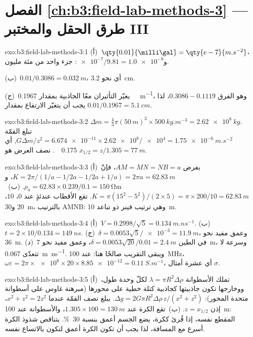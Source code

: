 \section*{الفصل \ref{ch:b3:field-lab-methods-3} --- طرق الحقل والمختبر III}

\begin{solution}{exo:b3:field-lab-methods-3:1}
(أ)~$\qty{0.01}{\milli\gal} = \qty{e-7}{m.s^{-2}}$،
و$\num{e-7}/\num{9.81} = \num{1.0e-8}$: جزء واحد من مئة مليون.

(ب)~$0.01/0.3086 = \qty{0.032}{m}$، أي نحو \qty{3.2}{cm}.

(ج)~يغيّر التأثيران معًا الجاذبية بمقدار
\qty{0.1967}{\milli\gal.m^{-1}}، وهو الفرق $0.3086 - 0.1119$، لذا
يجب أن يتغيّر الارتفاع بمقدار $0.01/0.1967 = \qty{5.1}{cm}$.
\end{solution}

\begin{solution}{exo:b3:field-lab-methods-3:2}
$\Delta m = \tfrac43\pi(\qty{50}{m})^3\times\qty{500}{kg.m^{-3}} =
\qty{2.62e8}{kg}$. تبلغ القمّة $G\Delta m/z^2 =
\num{6.674e-11}\times\num{2.62e8}/\num{e4} = \qty{1.75e-6}{m.s^{-2}}$,
أي \qty{0.175}{\milli\gal}. نصف العرض هو $x_{1/2} = z/1.305 =
\qty{77}{m}$.
\end{solution}

\begin{solution}{exo:b3:field-lab-methods-3:3}
(أ)~بفرض $AM = MN = NB = a$، فإنّ $K = 2\pi/(1/a - 1/2a - 1/2a + 1/a) =
2\pi a = \qty{62.83}{m}$، و$\rho_a = 62.83\times0.239/0.1 =
\qty{150}{\ohm\metre}$. (ب)~$K = \pi(15^2 - 5^2)/(2\times5) = \pi\times
200/10 = \qty{62.83}{m}$. تقع الأقطاب عندئذٍ عند $0$، $10$، $20$
و\qty{30}{m}، بالترتيب AMNB: وهي ترتيب فينر ذو تباعد
\qty{10}{m}.
\end{solution}

\begin{solution}{exo:b3:field-lab-methods-3:4}
(أ)~$V = 0.2998/\sqrt5 = \qty{0.134}{m.ns^{-1}}$. (ب)~$t =
2\times10/0.134 = \qty{149}{ns}$. (ج)~$\delta = 0.0053\sqrt5/\num{e-3} =
\qty{11.9}{m}$، وعمق مفيد نحو \qty{36}{m}. (د)~في الطين
$\delta = 0.0053\sqrt{20}/0.01 = \qty{2.4}{m}$، وعمق مفيد نحو
\qty{7}{m}، وسرعة لا تتعدّى \qty{0.067}{m.ns^{-1}}. ويبقى
التقريب صالحًا هنا: عند \qty{100}{MHz}،
$\omega\varepsilon = 2\pi\times\num{e8}\times20\times\num{8.85e-12} =
\qty{0.11}{S.m^{-1}}$، أي عشرة أمثال $\sigma$.
\end{solution}

\begin{solution}{exo:b3:field-lab-methods-3:5}
(أ)~تملك الأسطوانة $\lambda = \pi R^2\Delta\rho$ لكلّ وحدة طول،
ووخارجها تكون جاذبيتها كجاذبية كتلة خطية على محورها (مبرهنة غاوس
على أسطوانة متحدة المحور): $\Delta g = 2G\pi R^2\Delta\rho\,z/(x^2
+ z^2)$. يبلغ نصف القمّة عندما $x^2 + z^2 = 2z^2$، إذن $z =
x_{1/2}$. (ب)~تقع الكرة عند $1.305\times100 = \qty{130}{m}$،
والأسطوانة عند \qty{100}{m}: المقطع نفسه، إذا قُرئ ككرة، يضع الجسم
أعمق بنسبة \qty{30}{\percent}. يتناقص شذوذ الكرة أسرع مع
المسافة، لذا يجب أن تكون الكرة أعمق لتكون بالاتساع نفسه.
\end{solution}

